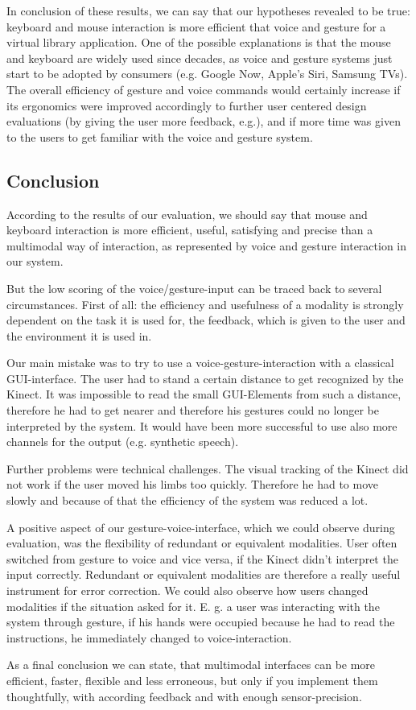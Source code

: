 \documentclass[a4paper, 10pt]{article}
\begin{document}
	\par{In conclusion of these results, we can say that our hypotheses revealed to be true: keyboard and mouse interaction is more efficient that voice and gesture for a virtual library application. One of the possible explanations is that the mouse and keyboard are widely used since decades, as voice and gesture systems just start to be adopted by consumers (e.g. Google Now, Apple’s Siri, Samsung TVs). The overall efficiency of gesture and voice commands would certainly increase if its ergonomics were improved accordingly to further user centered design evaluations (by giving the user more feedback, e.g.), and if more time was given to the users to get familiar with the voice and gesture system.}
	
	\subsection{Conclusion}
	
	\par{According to the results of our evaluation, we should say that mouse and keyboard interaction is more efficient, useful, satisfying and precise than a multimodal way of interaction, as represented by voice and gesture interaction in our system.}
	\par{But the low scoring of the voice/gesture-input can be traced back to several circumstances. First of all: the efficiency and usefulness of a modality is strongly dependent on the task it is used for, the feedback, which is given to the user and the environment it is used in. }
	\par{Our main mistake was to try to use a voice-gesture-interaction with a classical GUI-interface. The user had to stand a certain distance to get recognized by the Kinect. It was impossible to read the small GUI-Elements from such a distance, therefore he had to get nearer and therefore his gestures could no longer be interpreted by the system. It would have been more successful to use also more channels for the output (e.g. synthetic speech).}
	\par{Further problems were technical challenges. The visual tracking of the Kinect did not work if the user moved his limbs too quickly. Therefore he had to move slowly and because of that the efficiency of the system was reduced a lot.}
	\par{A positive aspect of our gesture-voice-interface, which we could observe during evaluation, was the flexibility of redundant or equivalent modalities. User often switched from gesture to voice and vice versa, if the Kinect didn’t interpret the input correctly. Redundant or equivalent modalities are therefore a really useful instrument for error correction. We could also observe how users changed modalities if the situation asked for it. E. g. a user was interacting with the system through gesture, if his hands were occupied because he had to read the instructions, he immediately changed to voice-interaction.}
	\par{As a final conclusion we can state, that multimodal interfaces can be more efficient, faster, flexible and less erroneous, but only if you implement them thoughtfully, with according feedback and with enough sensor-precision.}
	
\end{document}
